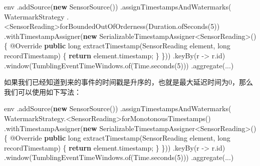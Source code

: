\documentclass[cn,11pt,chinese]{elegantbook}
\newenvironment{Shaded}{}{}
\newcommand{\AttributeTok}[1]{\textcolor[rgb]{0.49,0.56,0.16}{#1}}
\newcommand{\BuiltInTok}[1]{#1}
\newcommand{\DataTypeTok}[1]{\textcolor[rgb]{0.56,0.13,0.00}{#1}}
\newcommand{\DecValTok}[1]{\textcolor[rgb]{0.25,0.63,0.44}{#1}}
\newcommand{\FunctionTok}[1]{\textcolor[rgb]{0.02,0.16,0.49}{#1}}
\newcommand{\KeywordTok}[1]{\textcolor[rgb]{0.00,0.44,0.13}{\textbf{#1}}}
\newcommand{\NormalTok}[1]{#1}
\begin{document}
\begin{Shaded}
\begin{Highlighting}[]
\NormalTok{env}
\NormalTok{  .}\FunctionTok{addSource}\NormalTok{(}\KeywordTok{new} \FunctionTok{SensorSource}\NormalTok{())}
\NormalTok{  .}\FunctionTok{assignTimestampsAndWatermarks}\NormalTok{(}
\NormalTok{    WatermarkStrategy}
\NormalTok{      .\textless{}SensorReading\textgreater{}}\FunctionTok{forBoundedOutOfOrderness}\NormalTok{(}\BuiltInTok{Duration}\NormalTok{.}\FunctionTok{ofSeconds}\NormalTok{(}\DecValTok{5}\NormalTok{))}
\NormalTok{      .}\FunctionTok{withTimestampAssigner}\NormalTok{(}\KeywordTok{new}\NormalTok{ SerializableTimestampAssigner\textless{}SensorReading\textgreater{}() \{}
        \AttributeTok{@Override}
        \KeywordTok{public} \DataTypeTok{long} \FunctionTok{extractTimestamp}\NormalTok{(SensorReading element, }\DataTypeTok{long}\NormalTok{ recordTimestamp) \{}
          \KeywordTok{return}\NormalTok{ element.}\FunctionTok{timestamp}\NormalTok{;}
\NormalTok{        \}}
\NormalTok{      \}))}
\NormalTok{    .}\FunctionTok{keyBy}\NormalTok{(r {-}\textgreater{} r.}\FunctionTok{id}\NormalTok{)}
\NormalTok{    .}\FunctionTok{window}\NormalTok{(TumblingEventTimeWindows.}\FunctionTok{of}\NormalTok{(}\BuiltInTok{Time}\NormalTok{.}\FunctionTok{seconds}\NormalTok{(}\DecValTok{5}\NormalTok{)))}
\NormalTok{    .}\FunctionTok{aggregate}\NormalTok{(...)}
\end{Highlighting}
\end{Shaded}

如果我们已经知道到来的事件的时间戳是升序的，也就是最大延迟时间为0，那么我们可以使用如下写法：

\begin{Shaded}
\begin{Highlighting}[]
\NormalTok{env}
\NormalTok{  .}\FunctionTok{addSource}\NormalTok{(}\KeywordTok{new} \FunctionTok{SensorSource}\NormalTok{())}
\NormalTok{  .}\FunctionTok{assignTimestampsAndWatermarks}\NormalTok{(}
\NormalTok{    WatermarkStrategy.\textless{}SensorReading\textgreater{}}\FunctionTok{forMonotonousTimestamps}\NormalTok{()}
\NormalTok{      .}\FunctionTok{withTimestampAssigner}\NormalTok{(}\KeywordTok{new}\NormalTok{ SerializableTimestampAssigner\textless{}SensorReading\textgreater{}() \{}
        \AttributeTok{@Override}
        \KeywordTok{public} \DataTypeTok{long} \FunctionTok{extractTimestamp}\NormalTok{(SensorReading element, }\DataTypeTok{long}\NormalTok{ recordTimestamp) \{}
          \KeywordTok{return}\NormalTok{ element.}\FunctionTok{timestamp}\NormalTok{;}
\NormalTok{        \}}
\NormalTok{    \}))}
\NormalTok{    .}\FunctionTok{keyBy}\NormalTok{(r {-}\textgreater{} r.}\FunctionTok{id}\NormalTok{)}
\NormalTok{    .}\FunctionTok{window}\NormalTok{(TumblingEventTimeWindows.}\FunctionTok{of}\NormalTok{(}\BuiltInTok{Time}\NormalTok{.}\FunctionTok{seconds}\NormalTok{(}\DecValTok{5}\NormalTok{)))}
\NormalTok{    .}\FunctionTok{aggregate}\NormalTok{(...)}
\end{Highlighting}
\end{Shaded}
\end{document}
